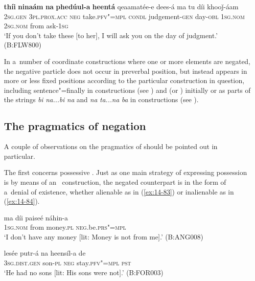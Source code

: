 \begin{exe}
\ex
\label{ex:14-82}
\gll \textbf{thíi} \textbf{ninaám} \textbf{na} \textbf{phedúul-a} \textbf{heentá}  qeaamatée-e dees-á ma tu díi khooǰ-áam \\
\textsc{2sg.gen} \textsc{3pl.prox.acc} \textsc{neg} take.\textsc{pfv"=mpl} \textsc{condl}  judgement-\textsc{gen} day-\textsc{obl} \textsc{1sg.nom} \textsc{2sg.nom} from ask-\textsc{1sg}  \\
\glt `If you don't take these [to her], I will ask you on the day of judgment.' (B:FLW800)
\end{exe}

In a~number of coordinate constructions where one or more elements are negated, the negative particle does not occur in preverbal position, but instead appears in more or less fixed positions according to the particular construction in question, including sentence"=finally in  constructions (see ) and  (or ) initially or as parts of the strings \textit{bi na...bi na} and \textit{na ta...na ba} in  constructions (see ). 


\subsection{The pragmatics of negation}
\label{subsec:14-3-4}


A couple of observations on the pragmatics of  should be pointed out in particular.


The first concerns possessive . Just as one main strategy of expressing possession is by means of an~ construction, the negated counterpart is in the form of a~denial of existence, whether alienable as in (\ref{ex:14-83}) or inalienable as in (\ref{ex:14-84}).

\begin{exe}
\ex
\label{ex:14-83}
\gll ma díi paiseé náhin-a \\
\textsc{1sg.nom} from money.\textsc{pl} \textsc{neg}.be.\textsc{prs"=mpl}  \\
\glt `I don't have any money [lit: Money is not from me].' (B:ANG008)

\ex
\label{ex:14-84}
\gll lesée putr-á na heensíl-a de \\
\textsc{3sg.dist.gen} son-\textsc{pl} \textsc{neg} stay.\textsc{pfv"=mpl} \textsc{pst}  \\
\glt `He had no sons [lit: His sons were not].' (B:FOR003)
\end{exe}

